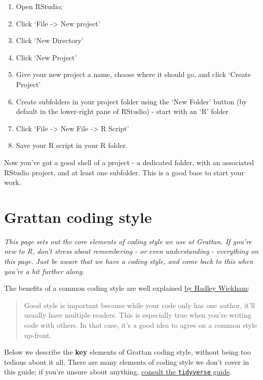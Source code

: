 \documentclass[
]{book}
\providecommand{\tightlist}{%
  \setlength{\itemsep}{0pt}\setlength{\parskip}{0pt}}
\begin{document}
\begin{enumerate}
\def\labelenumi{\arabic{enumi}.}
\tightlist
\item
  Open RStudio;
\item
  Click `File -\textgreater{} New project'
\item
  Click `New Directory'
\item
  Click `New Project'
\item
  Give your new project a name, choose where it should go, and click `Create Project'
\item
  Create subfolders in your project folder using the `New Folder' button (by default in the lower-right pane of RStudio) - start with an `R' folder
\item
  Click `File -\textgreater{} New File -\textgreater{} R Script'
\item
  Save your R script in your R folder.
\end{enumerate}

Now you've got a good shell of a project - a dedicated folder, with an associated RStudio project, and at least one subfolder. This is a good base to start your work.

\hypertarget{coding-style}{%
\chapter{Grattan coding style}\label{coding-style}}

\emph{This page sets out the core elements of coding style we use at Grattan. If you're new to R, don't stress about remembering - or even understanding - everything on this page. Just be aware that we have a coding style, and come back to this when you're a bit further along.}

The benefits of a common coding style are well explained \href{http://r-pkgs.had.co.nz/style.html}{by Hadley Wickham}:

\begin{quote}
Good style is important because while your code only has one author, it'll usually have multiple readers. This is especially true when you're writing code with others. In that case, it's a good idea to agree on a common style up-front.
\end{quote}

Below we describe the \textbf{key} elements of Grattan coding style, without being too tedious about it all. There are many elements of coding style we don't cover in this guide; if you're unsure about anything, \href{https://style.tidyverse.org/}{consult the \texttt{tidyverse} guide}.
\end{document}

